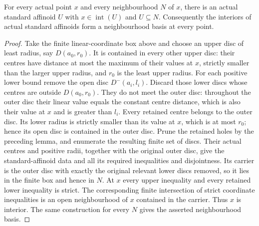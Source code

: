 \begin{theorem}\label{thm:fc-standard-affinoid-basis}
\leanok
{}
For every actual point $x$ and every neighbourhood $N$ of $x$, there is an
actual standard affinoid $U$ with $x\in\operatorname{int}(U)$ and $U\subseteq N$.
Consequently the interiors of actual standard affinoids form a neighbourhood
basis at every point.
\end{theorem}

\begin{proof}
Take the finite linear-coordinate box above and choose an upper disc of least
radius, say $D(a_0,r_0)$. It is contained in every other upper disc: their
centres have distance at most the maximum of their values at $x$, strictly
smaller than the larger upper radius, and $r_0$ is the least upper radius.
For each positive lower bound remove the open disc $D^-(a_i,l_i)$.
Discard those lower discs whose centres are outside $D(a_0,r_0)$. They do not
meet the outer disc: throughout the outer disc their linear value equals the
constant centre distance, which is also their value at $x$ and is greater
than $l_i$. Every retained centre belongs to the outer disc. Its lower radius
is strictly smaller than its value at $x$, which is at most $r_0$; hence its
open disc is contained in the outer disc. Prune the retained holes by the
preceding lemma, and enumerate the resulting finite set of discs. Their actual
centres and positive radii, together with the original outer disc, give the
standard-affinoid data and all its required inequalities and disjointness.
Its carrier is the outer disc with exactly the original relevant lower discs
removed, so it lies in the finite box and hence in $N$.
At $x$ every upper inequality and every retained lower inequality is strict.
The corresponding finite intersection of strict coordinate inequalities is an
open neighbourhood of $x$ contained in the carrier. Thus $x$ is interior.
The same construction for every $N$ gives the asserted neighbourhood basis.
\end{proof}

